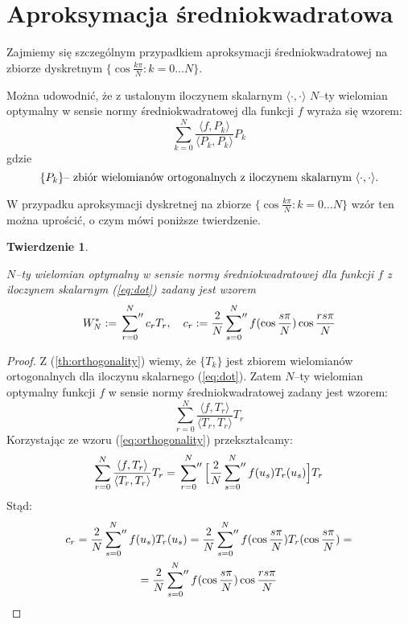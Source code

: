\documentclass{article}
\newtheorem{theorem}{Twierdzenie}
\newcommand{\sumbis}[3] {
	\sideset{}{''}\sum_{#1}^{#2} #3
}
\newcommand{\dotproduct}[2] {
	\langle #1 , #2 \rangle
}
\begin{document}
\section{Aproksymacja średniokwadratowa}

Zajmiemy się szczególnym przypadkiem aproksymacji średniokwadratowej na zbiorze dyskretnym $  \{ \cos{ \frac{k \pi}{N} }  : k = 0 \ldots N \}$.

\par Można udowodnić, że z ustalonym iloczynem skalarnym $\dotproduct{ \cdot}{\cdot}$ $N$--ty wielomian optymalny w sensie normy średniokwadratowej dla funkcji $f$ wyraża się wzorem:
\begin{equation} 
		 \sum_{k=0}^{N} \frac{ \dotproduct{f}{P_k} }{ \dotproduct{P_k}{P_k} } P_k 
\end{equation}
gdzie 
$$ \{ P_k \} \text{-- zbiór wielomianów ortogonalnych z iloczynem skalarnym $\dotproduct{ \cdot}{\cdot}$.} $$

W przypadku aproksymacji dyskretnej na zbiorze $  \{ \cos{ \frac{k \pi}{N} }  : k = 0 \ldots N \}$ wzór ten można uprościć, o czym mówi poniższe twierdzenie.

\begin{theorem}
	\label{th:appprox}
	
	$N$--ty wielomian optymalny w sensie normy średniokwadratowej dla funkcji $f$ z iloczynem skalarnym (\ref{eq:dot}) zadany jest wzorem
	\begin{equation}
		\label{eq:approx}
		W_N^{*} := \sumbis{r=0}{N}{c_r T_r} , \quad  c_r := 
		\frac{2}{N} \sumbis{s=0}{N}{ f(\cos{\frac{s \pi}{N}}) \cos{\frac{rs \pi}{N}} } 
	\end{equation}
\end{theorem}

\begin{proof}
	Z (\ref{th:orthogonality}) wiemy, że $\{ T_k \}$ jest zbiorem wielomianów ortogonalnych dla iloczynu skalarnego (\ref{eq:dot}). Zatem $N$--ty wielomian optymalny funkcji $f$ w sensie normy średniokwadratowej zadany jest wzorem:
	$$ \sum_{r=0}^{N} \frac{ \dotproduct{f}{T_r} }{ \dotproduct{T_r}{T_r} } T_r $$
	Korzystając ze wzoru (\ref{eq:orthogonality}) przekształcamy:
	\begin{gather*}
		\sum_{r=0}^{N} \frac{ \dotproduct{f}{T_r} }{ \dotproduct{T_r}{T_r} } T_r = 
		 \sumbis{r=0}{N}{ \Big[ \frac{2}{N} \sumbis{s=0}{N}{f(u_s) T_r(u_s) } \Big] T_r }  \\
	\end{gather*}
	Stąd:
	\begin{gather*}
		c_r = \frac{2}{N} \sumbis{s=0}{N}{f(u_s) T_r(u_s)} = 
		\frac{2}{N} \sumbis{s=0}{N}{ f( \cos{ \frac{s \pi}{N} } )  T_r( \cos{ \frac{s \pi}{N} } ) } = \\
		= \frac{2}{N} \sumbis{s=0}{N}{ f( \cos{ \frac{s \pi}{N} } )  \cos{ \frac{rs \pi}{N} } }
	\end{gather*}
\end{proof}
\end{document}
